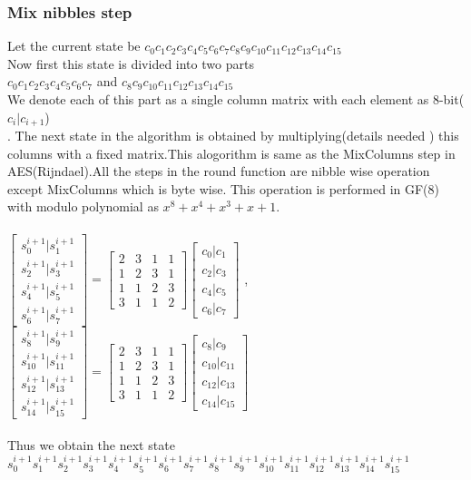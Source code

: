 \documentclass[preprint]{transcrypto}
\begin{document}
\subsubsection{Mix nibbles step}
Let the current state be $c_{0} c_{1} c_{2} c_{3} c_{4} c_{5} c_{6} c_{7} c_{8} c_{9} c_{10} c_{11} c_{12} c_{13} c_{14} c_{15}$\\
Now first this state is divided into two parts \\
$ c_{0} c_{1} c_{2} c_{3} c_{4} c_{5} c_{6} c_{7} $ and $c_{8} c_{9} c_{10} c_{11} c_{12} c_{13} c_{14} c_{15}$ \\
We denote each of this part as a single column matrix with each element as 8-bit($c_{i}|c_{i+1}$) \\. The next state in the algorithm is obtained by multiplying(details needed ) this columns with a fixed matrix.This alogorithm is same as the MixColumns step in AES(Rijndael).All the steps in the round function are nibble wise operation except MixColumns which is byte wise. This operation is performed in GF(8) with modulo polynomial as $x^{8} + x^{4} + x^{3} + x + 1$.\\ \\
$\begin{bmatrix}
s^{i+1}_{0} | s^{i+1}_{1}\\
s^{i+1}_{2} | s^{i+1}_{3}\\
s^{i+1}_{4} | s^{i+1}_{5}\\
s^{i+1}_{6} | s^{i+1}_{7}
\end{bmatrix}=
\begin{bmatrix}
2&3&1&1\\
1&2&3&1\\
1&1&2&3\\
3&1&1&2
\end{bmatrix}
\begin{bmatrix}
c_{0}|c_{1}\\
c_{2}|c_{3}\\
c_{4}|c_{5}\\
c_{6}|c_{7}
\end{bmatrix}  $ ,
$\begin{bmatrix}
s^{i+1}_{8} | s^{i+1}_{9}\\
s^{i+1}_{10} | s^{i+1}_{11}\\
s^{i+1}_{12} | s^{i+1}_{13}\\
s^{i+1}_{14} | s^{i+1}_{15}
\end{bmatrix}=
\begin{bmatrix}
2&3&1&1\\
1&2&3&1\\
1&1&2&3\\
3&1&1&2
\end{bmatrix}
\begin{bmatrix}
c_{8}|c_{9}\\
c_{10}|c_{11}\\
c_{12}|c_{13}\\
c_{14}|c_{15}
\end{bmatrix}  $\\ \\
Thus we obtain the next state 
$ s^{i+1}_{0}  s^{i+1}_{1}
s^{i+1}_{2}  s^{i+1}_{3}
s^{i+1}_{4}  s^{i+1}_{5}
s^{i+1}_{6}  s^{i+1}_{7}
s^{i+1}_{8}  s^{i+1}_{9}
s^{i+1}_{10}  s^{i+1}_{11}
s^{i+1}_{12}  s^{i+1}_{13}
s^{i+1}_{14}  s^{i+1}_{15} $
\end{document}
